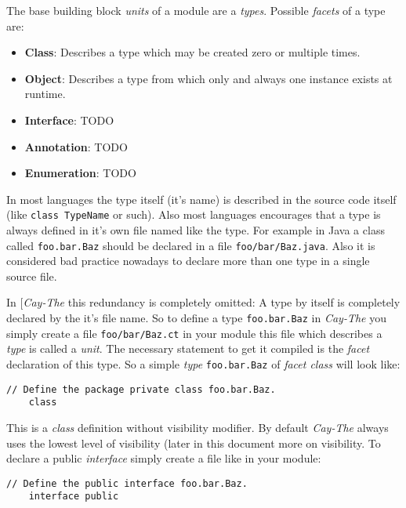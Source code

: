\documentclass[11pt,a4paper]{report}
\begin{document}

The base building block \textit{units} of a module are a \textit{types}. Possible \textit{facets} of a type are:

\begin{itemize}
    \item \textbf{Class}: Describes a type which may be created zero or multiple times.
    \item \textbf{Object}: Describes a type from which only and always one instance exists at runtime.
    \item \textbf{Interface}: TODO
    \item \textbf{Annotation}: TODO
    \item \textbf{Enumeration}: TODO
\end{itemize}

In most languages the type itself (it's name) is described in the source code itself (like \texttt{class TypeName} or such). Also most languages encourages that a type is always defined in it's own file named like the type. For example in Java a class called \texttt{foo.bar.Baz} should be declared in a file \texttt{foo/bar/Baz.java}. Also it is considered bad practice nowadays to declare more than one type in a single source file.

In [\textit{Cay-The} this redundancy is completely omitted: A type by itself is completely declared by the it's file name. So to define a type \texttt{foo.bar.Baz} in \textit{Cay-The} you simply create a file \texttt{foo/bar/Baz.ct} in your module this file which describes a \textit{type} is called a \textit{unit}. The necessary statement to get it compiled is the \textit{facet} declaration of this type. So a simple \textit{type} \texttt{foo.bar.Baz} of \textit{facet class} will look like:

\begin{lstlisting}[language=CayThe, title=foo/bar.Baz.ct]
    // Define the package private class foo.bar.Baz.
    class
\end{lstlisting}

This is a \textit{class} definition without visibility modifier. By default \textit{Cay-The} always uses the lowest level of visibility (later in this document more on visibility. To declare a public \textit{interface} simply create a file like in your module:

\begin{lstlisting}[language=CayThe, title=foo/bar/Baz.ct]
    // Define the public interface foo.bar.Baz.
    interface public
\end{lstlisting}
\end{document}
